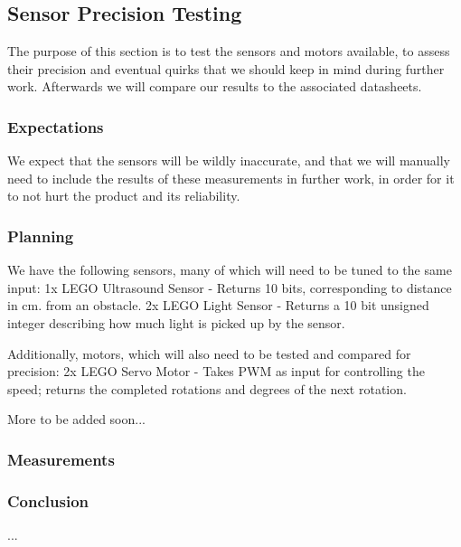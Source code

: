 \subsection{Sensor Precision Testing}
The purpose of this section is to test the sensors and motors available, to assess their precision and eventual quirks that we should keep in mind during further work. Afterwards we will compare our results to the associated datasheets.

\subsubsection{Expectations}
We expect that the sensors will be wildly inaccurate, and that we will manually need to include the results of these measurements in further work, in order for it to not hurt the product and its reliability.

\subsubsection{Planning}
We have the following sensors, many of which will need to be tuned to the same input:
1x LEGO Ultrasound Sensor
- Returns 10 bits, corresponding to distance in cm. from an obstacle.
2x LEGO Light Sensor
- Returns a 10 bit unsigned integer describing how much light is picked up by the sensor.

Additionally, motors, which will also need to be tested and compared for precision: 
2x LEGO Servo Motor
- Takes PWM\todo{} as input for controlling the speed; returns the completed rotations and degrees of the next rotation.

More to be added soon... \todo{}

\subsubsection{Measurements}




\subsubsection{Conclusion}
...